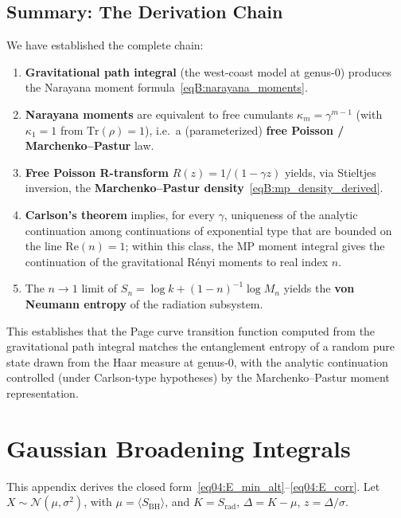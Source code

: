 \documentclass[11pt,letterpaper]{article}
\theoremstyle{plain}
\theoremstyle{definition}
\theoremstyle{remark}
\begin{document}
\subsection{Summary: The Derivation Chain}
\label{subsecB:summary}

We have established the complete chain:

\begin{enumerate}
\item \textbf{Gravitational path integral} (the west-coast model at genus-0) produces the Narayana moment formula~\eqref{eqB:narayana_moments}.

\item \textbf{Narayana moments} are equivalent to free cumulants $\kappa_m=\gamma^{m-1}$ (with $\kappa_1=1$ from $\mathrm{Tr}(\rho)=1$), i.e.\ a (parameterized) \textbf{free Poisson / Marchenko--Pastur} law.

\item \textbf{Free Poisson R-transform} $R(z) = 1/(1-\gamma z)$ yields, via Stieltjes inversion, the \textbf{Marchenko--Pastur density}~\eqref{eqB:mp_density_derived}.

\item \textbf{Carlson's theorem} implies, for every $\gamma$, uniqueness of the analytic continuation among continuations of exponential type that are bounded on the line $\mathrm{Re}(n) = 1$; within this class, the MP moment integral gives the continuation of the gravitational R\'enyi moments to real index $n$.

\item The $n \to 1$ limit of $S_n = \log k + (1-n)^{-1} \log M_n$ yields the \textbf{von Neumann entropy} of the radiation subsystem.
\end{enumerate}

This establishes that the Page curve transition function computed from the gravitational path integral matches the entanglement entropy of a random pure state drawn from the Haar measure at genus-0, with the analytic continuation controlled (under Carlson-type hypotheses) by the Marchenko--Pastur moment representation.



\section{Gaussian Broadening Integrals}
\label{app:broadening_integrals}

This appendix derives the closed form~\eqref{eq04:E_min_alt}--\eqref{eq04:E_corr}. Let $X \sim \mathcal{N}(\mu, \sigma^2)$, with $\mu = \langle S_{\mathrm{BH}}\rangle$, and $K = S_{\mathrm{rad}}$, $\Delta = K - \mu$, $z = \Delta/\sigma$.
\end{document}
